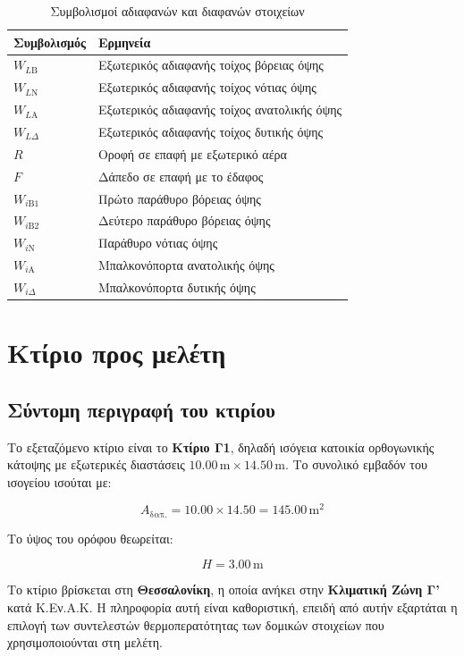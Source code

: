 \documentclass[12pt,a4paper]{article}
\begin{document}
\begin{table}[H]
\centering
\small
\caption{Συμβολισμοί αδιαφανών και διαφανών στοιχείων}
\begin{tabularx}{\textwidth}{C{2.6cm} L}
\toprule
\textbf{Συμβολισμός} & \textbf{Ερμηνεία} \\
\midrule
\(W_{L\mathrm{B}}\) & Εξωτερικός αδιαφανής τοίχος βόρειας όψης \\
\(W_{L\mathrm{N}}\) & Εξωτερικός αδιαφανής τοίχος νότιας όψης \\
\(W_{L\mathrm{A}}\) & Εξωτερικός αδιαφανής τοίχος ανατολικής όψης \\
\(W_{L\Delta}\) & Εξωτερικός αδιαφανής τοίχος δυτικής όψης \\
\(R\) & Οροφή σε επαφή με εξωτερικό αέρα \\
\(F\) & Δάπεδο σε επαφή με το έδαφος \\
\(W_{i\mathrm{B}1}\) & Πρώτο παράθυρο βόρειας όψης \\
\(W_{i\mathrm{B}2}\) & Δεύτερο παράθυρο βόρειας όψης \\
\(W_{i\mathrm{N}}\) & Παράθυρο νότιας όψης \\
\(W_{i\mathrm{A}}\) & Μπαλκονόπορτα ανατολικής όψης \\
\(W_{i\Delta}\) & Μπαλκονόπορτα δυτικής όψης \\
\bottomrule
\end{tabularx}
\end{table}

\section{Κτίριο προς μελέτη}

\subsection{Σύντομη περιγραφή του κτιρίου}

Το εξεταζόμενο κτίριο είναι το \textbf{Κτίριο Γ1}, δηλαδή ισόγεια κατοικία ορθογωνικής
κάτοψης με εξωτερικές διαστάσεις \(10.00\,\mathrm{m} \times 14.50\,\mathrm{m}\).
Το συνολικό εμβαδόν του ισογείου ισούται με:

\[
A_{\text{δαπ.}} = 10.00 \times 14.50 = 145.00\,\mathrm{m^2}
\]

Το ύψος του ορόφου θεωρείται:

\[
H = 3.00\,\mathrm{m}
\]

Το κτίριο βρίσκεται στη \textbf{Θεσσαλονίκη}, η οποία ανήκει στην \textbf{Κλιματική Ζώνη Γ'}
κατά Κ.Εν.Α.Κ. Η πληροφορία αυτή είναι καθοριστική, επειδή από αυτήν εξαρτάται η επιλογή
των συντελεστών θερμοπερατότητας των δομικών στοιχείων που χρησιμοποιούνται στη μελέτη.
\end{document}
